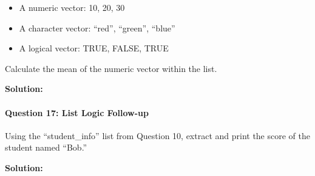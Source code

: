\documentclass[
]{article}
\newenvironment{Shaded}{\begin{snugshade}}{\end{snugshade}}
\newcommand{\AttributeTok}[1]{\textcolor[rgb]{0.13,0.29,0.53}{#1}}
\newcommand{\CommentTok}[1]{\textcolor[rgb]{0.56,0.35,0.01}{\textit{#1}}}
\newcommand{\ConstantTok}[1]{\textcolor[rgb]{0.56,0.35,0.01}{#1}}
\newcommand{\DecValTok}[1]{\textcolor[rgb]{0.00,0.00,0.81}{#1}}
\newcommand{\FunctionTok}[1]{\textcolor[rgb]{0.13,0.29,0.53}{\textbf{#1}}}
\newcommand{\NormalTok}[1]{#1}
\newcommand{\OtherTok}[1]{\textcolor[rgb]{0.56,0.35,0.01}{#1}}
\newcommand{\SpecialCharTok}[1]{\textcolor[rgb]{0.81,0.36,0.00}{\textbf{#1}}}
\newcommand{\StringTok}[1]{\textcolor[rgb]{0.31,0.60,0.02}{#1}}
\begin{document}
\begin{itemize}
\item
  A numeric vector: 10, 20, 30
\item
  A character vector: ``red'', ``green'', ``blue''
\item
  A logical vector: TRUE, FALSE, TRUE
\end{itemize}

Calculate the mean of the numeric vector within the list.

\textbf{Solution:}

\begin{Shaded}
\end{Shaded}

\hypertarget{question-17-list-logic-follow-up}{%
\paragraph{Question 17: List Logic
Follow-up}\label{question-17-list-logic-follow-up}}

Using the ``student\_info'' list from Question 10, extract and print the
score of the student named ``Bob.''

\textbf{Solution:}

\begin{Shaded}
\end{Shaded}
\end{document}
